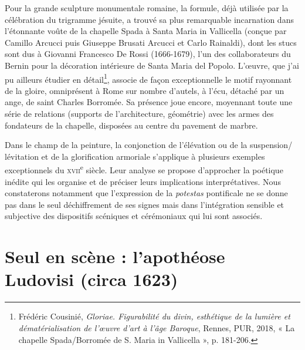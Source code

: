 \documentclass[12pt,twoside,openany]{book}
\begin{document}
Pour la grande sculpture monumentale romaine, la formule, déjà utilisée par la célébration du trigramme jésuite, a trouvé sa plus remarquable incarnation dans l’étonnante voûte de la chapelle Spada à Santa Maria in Vallicella (conçue par Camillo Arcucci puis Giuseppe Brusati Arcucci et Carlo Rainaldi), dont les stucs sont dus à Giovanni Francesco De Rossi (1666-1679), l’un des collaborateurs du Bernin pour la décoration intérieure de Santa Maria del Popolo. L’œuvre, que j’ai pu ailleurs étudier en détail\footnote{Frédéric Cousinié, \textit{Gloriae. Figurabilité du divin, esthétique de la lumière et dématérialisation de l’œuvre d’art à l’âge Baroque}, Rennes, PUR, 2018, « La chapelle Spada/Borromée de S. Maria in Vallicella », p. 181-206.}, associe de façon exceptionnelle le motif rayonnant de la gloire, omniprésent à Rome sur nombre d’autels, à l’écu, détaché par un ange, de saint Charles Borromée. Sa présence joue encore, moyennant toute une série de relations (supports de l’architecture, géométrie) avec les armes des fondateurs de la chapelle, disposées au centre du pavement de marbre.

Dans le champ de la peinture, la conjonction de l’élévation ou de la suspension/ lévitation et de la glorification armoriale s’applique à plusieurs exemples exceptionnels du \textsc{xvii}\textsuperscript{e} siècle. Leur analyse se propose d’approcher la poétique inédite qui les organise et de préciser leurs implications interprétatives. Nous constaterons notamment que l’expression de la \textit{potestas} pontificale ne se donne pas dans le seul déchiffrement de ses signes mais dans l’intégration sensible et subjective des dispositifs scéniques et cérémoniaux qui lui sont associés.

\section{Seul en scène : l’apothéose Ludovisi (circa 1623)}
\end{document}
